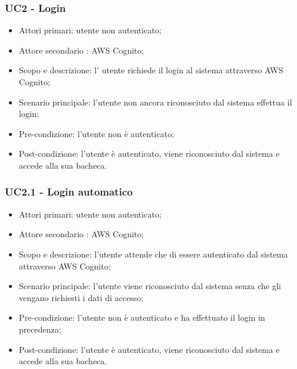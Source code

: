 
\subsubsection{UC2 - Login}
\begin{itemize}
	\item  Attori primari: utente non autenticato;
	\item  Attore secondario : AWS Cognito;
	\item  Scopo e descrizione: l' utente richiede il login al sistema attraverso AWS Cognito;
	\item  Scenario principale: l’utente non ancora riconosciuto dal sistema effettua il login;
		    
	\item  Pre-condizione: l'utente non è autenticato;
	\item  Post-condizione: l'utente è autenticato, viene riconosciuto dal sistema e accede alla sua bacheca.
\end{itemize}

\subsubsection{UC2.1 - Login automatico}
\begin{itemize}
	\item  Attori primari: utente non autenticato;
    \item  Attore secondario : AWS Cognito;
	\item  Scopo e descrizione: l'utente attende che di essere autenticato dal sistema attraverso AWS   Cognito;
	\item  Scenario principale: l'utente viene riconosciuto dal sistema senza che gli vengano richiesti i dati di accesso;
	\item  Pre-condizione: l'utente non è autenticato e ha effettuato il login in precedenza;
	\item  Post-condizione: l'utente è autenticato, viene riconosciuto dal sistema e accede alla sua bacheca.
\end{itemize}

